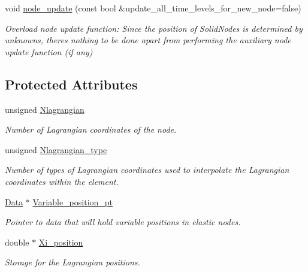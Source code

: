 \begin{DoxyCompactItemize}
void \hyperlink{classoomph_1_1SolidNode_ae66793af1a576edd29523ffb98b7225c}{node\+\_\+update} (const bool \&update\+\_\+all\+\_\+time\+\_\+levels\+\_\+for\+\_\+new\+\_\+node=false)
\begin{DoxyCompactList}\small\item\em Overload node update function\+: Since the position of Solid\+Nodes is determined by unknowns, there\textquotesingle{}s nothing to be done apart from performing the auxiliary node update function (if any) \end{DoxyCompactList}\end{DoxyCompactItemize}
\subsection*{Protected Attributes}
\begin{DoxyCompactItemize}
\item 
unsigned \hyperlink{classoomph_1_1SolidNode_a155e729f069278a17a2828690ed67904}{Nlagrangian}
\begin{DoxyCompactList}\small\item\em Number of Lagrangian coordinates of the node. \end{DoxyCompactList}\item 
unsigned \hyperlink{classoomph_1_1SolidNode_a6676ab16593ad3d062ac8e29906d7786}{Nlagrangian\+\_\+type}
\begin{DoxyCompactList}\small\item\em Number of types of Lagrangian coordinates used to interpolate the Lagrangian coordinates within the element. \end{DoxyCompactList}\item 
\hyperlink{classoomph_1_1Data}{Data} $\ast$ \hyperlink{classoomph_1_1SolidNode_a5f3dce8a2802efc650d67cbf7e407a98}{Variable\+\_\+position\+\_\+pt}
\begin{DoxyCompactList}\small\item\em Pointer to data that will hold variable positions in elastic nodes. \end{DoxyCompactList}\item 
double $\ast$ \hyperlink{classoomph_1_1SolidNode_ac8ed3701effa80f70d817ee171559d1f}{Xi\+\_\+position}
\begin{DoxyCompactList}\small\item\em Storage for the Lagrangian positions. \end{DoxyCompactList}\end{DoxyCompactItemize}
